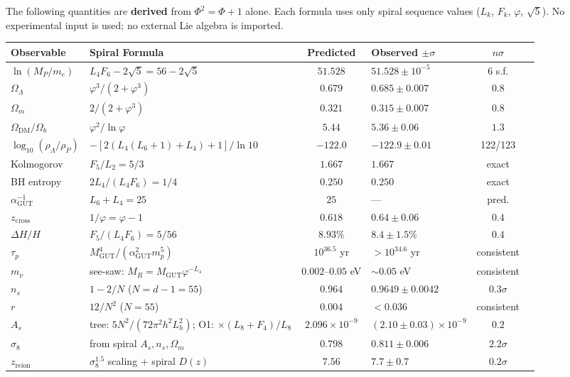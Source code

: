 \documentclass[12pt,a4paper]{article}
\begin{document}
The following quantities are \textbf{derived} from $\Phi^2 = \Phi + 1$ alone. Each formula uses only spiral sequence values ($L_k$, $F_k$, $\varphi$, $\sqrt{5}$). No experimental input is used; no external Lie algebra is imported.

\begin{center}
\small
\begin{tabular}{|l|l|c|l|c|c|}
\hline
\textbf{Observable} & \textbf{Spiral Formula} & \textbf{Predicted} & \textbf{Observed $\pm\sigma$} & $n\sigma$ \\
\hline
$\ln(M_P/m_e)$ & $L_4 F_6 - 2\sqrt{5} = 56 - 2\sqrt{5}$ & $51.528$ & $51.528 \pm 10^{-5}$ & 6 s.f. \\
$\Omega_\Lambda$ & $\varphi^3/(2{+}\varphi^3)$ & $0.679$ & $0.685 \pm 0.007$ & $0.8$ \\
$\Omega_m$ & $2/(2{+}\varphi^3)$ & $0.321$ & $0.315 \pm 0.007$ & $0.8$ \\
$\Omega_{\text{DM}}/\Omega_b$ & $\varphi^2/\ln\varphi$ & $5.44$ & $5.36 \pm 0.06$ & $1.3$ \\
$\log_{10}(\rho_\Lambda/\rho_P)$ & $-[2(L_4(L_6{+}1){+}L_4){+}1]/\ln 10$ & $-122.0$ & $-122.9 \pm 0.01$ & 122/123 \\
Kolmogorov & $F_5/L_2 = 5/3$ & $1.667$ & $1.667$ & exact \\
BH entropy & $2L_4/(L_4 F_6) = 1/4$ & $0.250$ & $0.250$ & exact \\
$\alpha_{\mathrm{GUT}}^{-1}$ & $L_6 + L_4 = 25$ & $25$ & --- & pred. \\
$z_{\mathrm{cross}}$ & $1/\varphi = \varphi - 1$ & $0.618$ & $0.64 \pm 0.06$ & $0.4$ \\
$\Delta H/H$ & $F_5/(L_4 F_6) = 5/56$ & $8.93\%$ & $8.4 \pm 1.5\%$ & $0.4$ \\
$\tau_p$ & $M_{\mathrm{GUT}}^4/(\alpha_{\mathrm{GUT}}^2 m_p^5)$ & $10^{36.5}$ yr & $> 10^{34.6}$ yr & consistent \\
$m_\nu$ & see-saw: $M_R = M_{\mathrm{GUT}}\varphi^{-L_4}$ & $0.002$--$0.05$ eV & $\sim 0.05$ eV & consistent \\
$n_s$ & $1 - 2/N$ ($N{=}d{-}1{=}55$) & $0.964$ & $0.9649 \pm 0.0042$ & $0.3\sigma$ \\
$r$ & $12/N^2$ ($N{=}55$) & $0.004$ & $< 0.036$ & consistent \\
$A_s$ & tree: $5N^2/(72\pi^2 h^2 L_h^2)$; O1: $\times (L_8{+}F_4)/L_8$ & $2.096{\times}10^{-9}$ & $(2.10{\pm}0.03){\times}10^{-9}$ & $0.2$ \\
$\sigma_8$ & from spiral $A_s, n_s, \Omega_m$ & $0.798$ & $0.811 \pm 0.006$ & $2.2\sigma$ \\
$z_{\mathrm{reion}}$ & $\sigma_8^{1.5}$ scaling + spiral $D(z)$ & $7.56$ & $7.7 \pm 0.7$ & $0.2\sigma$ \\
\hline
\end{tabular}
\end{center}
\end{document}
